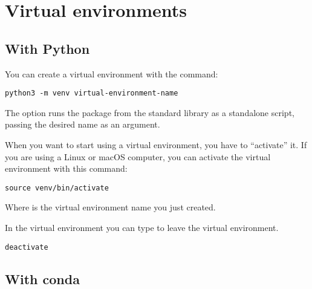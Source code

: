 
\chapter{Virtual environments}
\label{cha:virtual-environments}

\section{With Python}
\label{sec:with-python}

You can create a virtual environment with the  command:
\begin{lstlisting}
python3 -m venv virtual-environment-name
\end{lstlisting}

The  option runs the  package from the standard library as a standalone script, passing the desired name as an argument.

When you want to start using a virtual environment, you have to ``activate'' it.
If you are using a Linux or macOS computer, you can activate the virtual environment with this command:
\begin{lstlisting}
source venv/bin/activate
\end{lstlisting}

Where  is the virtual environment name you just created.

In the virtual environment you can type  to leave the virtual environment.
\begin{lstlisting}
deactivate
\end{lstlisting}


\section{With conda}
\label{sec:with-conda}




